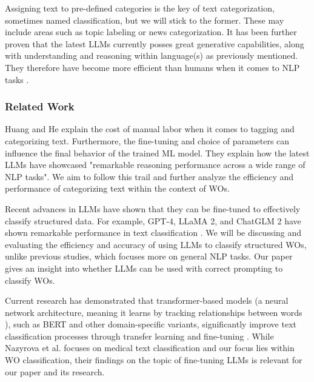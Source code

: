 \documentclass{article}
\begin{document}
Assigning text to pre-defined categories is the key of text categorization,
sometimes named classification, but we will stick to the former.
These may include areas such as topic labeling or news categorization.
It has been further proven that the latest LLMs currently posses great generative capabilities,
along with understanding and reasoning within language(s) as previously mentioned.
They therefore have become more efficient than humans when it comes to NLP tasks \cite{zhang2024}.

\subsubsection{Related Work}

Huang and He \cite{huang2024} explain the cost of manual labor when it comes to tagging and categorizing text.
Furthermore, the fine-tuning and choice of parameters can influence the final behavior of the trained ML model.
They explain how the latest LLMs have showcased "remarkable reasoning performance across a wide range of
NLP tasks".
We aim to follow this trail and further analyze the efficiency and performance of categorizing text within the
context of WOs.

\bigskip
Recent advances in LLMs have shown that they can be fine-tuned to effectively classify structured data.
For example, GPT-4, LLaMA 2, and ChatGLM 2 have shown remarkable performance in text classification \cite{zhang2024}.
We will be discussing and evaluating the efficiency and accuracy of using LLMs
to classify structured WOs, unlike previous studies, which focuses more on general NLP tasks.
Our paper gives an insight into whether LLMs can be used with correct prompting to classify WOs.

\bigskip
Current research has demonstrated that transformer-based models
(a neural network architecture, meaning it learns by tracking relationships between words \cite{merritt2022}),
such as BERT and other domain-specific variants, significantly improve text classification processes through
transfer learning and fine-tuning \cite{nazyrova2024}.
While Nazyrova et al. focuses on medical text classification and our focus lies within WO classification,
their findings on the topic of fine-tuning LLMs is relevant for our paper and its research.



\end{document}
